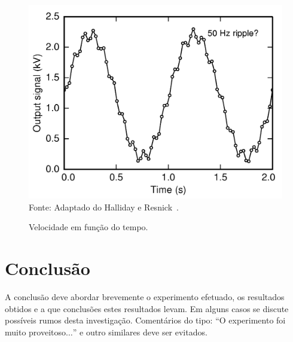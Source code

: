 \documentclass[a4paper, 12pt]{article}
\begin{document}
\begin{figure}[!htpb]
	\centering
	\caption{Velocidade em função do tempo.}
	\includegraphics[scale=0.15]{./pictures/grafico1.png}
	Fonte: Adaptado do Halliday e Resnick~\cite{Halliday-II}.
\end{figure}

\section{Conclusão}
A conclusão deve abordar brevemente o experimento efetuado, os resultados obtidos e a que conclusões estes resultados levam. Em alguns casos se discute possíveis rumos desta investigação. Comentários do tipo: ``O experimento foi muito proveitoso$\dots$'' e outro similares deve ser evitados.




\end{document}
